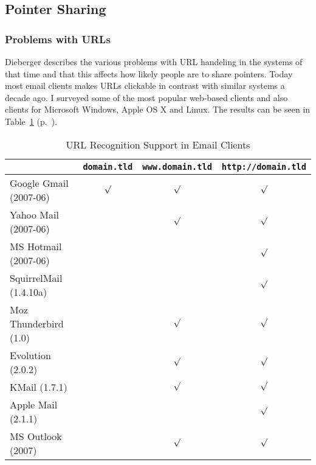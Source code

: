 \documentclass[12pt,a4paper]{article}
\begin{document}
\subsection{Pointer Sharing}

\subsubsection{Problems with URLs}

Dieberger describes the various problems with URL handeling in the systems of
that time and that this affects how likely people are to share pointers. Today
most email clients makes URLs clickable in contrast with similar systems a
decade ago. I surveyed some of the most popular web-based clients and also
clients for Microsoft Windows, Apple OS X and Linux. The results can be seen
in Table~\ref{table:email} (p.~\pageref{table:email}).

\begin{table}[h!b!p!]
  \caption{URL Recognition Support in Email Clients}
  \label{table:email}
  \begin{center}
    \begin{small}
      \begin{tabular}{l|ccc}
        &
        \texttt{domain.tld} &
        \texttt{www.domain.tld} &
        \texttt{http://domain.tld} \\
        \hline
        Google Gmail (2007-06) & $\surd$ & $\surd$ & $\surd$ \\
        Yahoo Mail (2007-06)   &         & $\surd$ & $\surd$ \\
        MS Hotmail (2007-06)   &         &         & $\surd$ \\
        SquirrelMail (1.4.10a) &         &         & $\surd$ \\
        Moz Thunderbird (1.0)  &         & $\surd$ & $\surd$ \\
        Evolution (2.0.2)      &         & $\surd$ & $\surd$ \\
        KMail (1.7.1)          &         & $\surd$ & $\surd$ \\
        Apple Mail (2.1.1)     &         &         & $\surd$ \\
        MS Outlook (2007)      &         & $\surd$ & $\surd$ \\
      \end{tabular}
    \end{small}
  \end{center}
\end{table}
\end{document}
